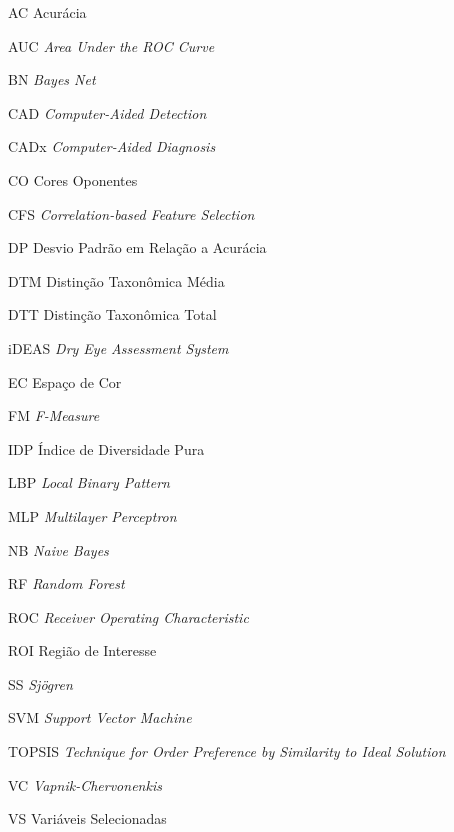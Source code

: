 \documentclass[
	12pt,				%
	openright,			%
	oneside,			%
	a4paper,			%
	chapter=TITLE,		%
	english,			%
	french,				%
	spanish,			%
	brazil				%
	]{abntex2}
\begin{document}
\begin{siglas}
 \item[AC] Acurácia
 \item[AUC] \textit{Area Under the ROC Curve}
 \item[BN] \textit{Bayes Net}
 \item[CAD] \textit{Computer-Aided Detection}
 \item[CADx] \textit{Computer-Aided Diagnosis}
 \item[CO] Cores Oponentes
 \item[CFS] \textit{Correlation-based Feature Selection}
 \item[DP] Desvio Padrão em Relação a Acurácia
 \item[DTM] Distinção Taxonômica Média
 \item[DTT] Distinção Taxonômica Total
 \item[iDEAS] \textit{Dry Eye Assessment System}
 \item[EC] Espaço de Cor
 \item[FM] \textit{F-Measure}
 \item[IDP] Índice de Diversidade Pura
 \item[LBP] \textit{Local Binary Pattern}
 \item[MLP] \textit{Multilayer Perceptron}
 \item[NB] \textit{Naive Bayes}
 \item[RF] \textit{Random Forest}
 \item[ROC] \textit{Receiver Operating Characteristic}
 \item[ROI] Região de Interesse
 \item[SS] \textit{Sjögren}
 \item[SVM] \textit{Support Vector Machine} 
 \item[TOPSIS] \textit{Technique for Order Preference by Similarity to Ideal Solution}
 \item[VC] \textit{Vapnik-Chervonenkis}
 \item[VS] Variáveis Selecionadas
 
\end{siglas}
\end{document}
